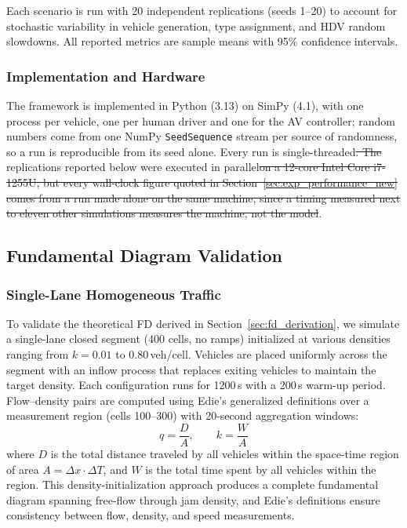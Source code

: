 \documentclass[review,number]{elsarticle} %
\providecommand{\DIFaddtex}[1]{{\protect\color{blue}\uwave{#1}}} %
\providecommand{\DIFdeltex}[1]{{\protect\color{red}\sout{#1}}}                      %
\providecommand{\DIFaddbegin}{} %
\providecommand{\DIFaddend}{} %
\providecommand{\DIFdelbegin}{} %
\providecommand{\DIFdelend}{} %
\providecommand{\DIFadd}[1]{\texorpdfstring{\DIFaddtex{#1}}{#1}} %
\providecommand{\DIFdel}[1]{\texorpdfstring{\DIFdeltex{#1}}{}} %
\newcommand{\DIFscaledelfig}{0.5}
\newlength{\DIFdelgraphicswidth} %
\newlength{\DIFdelgraphicsheight} %
\newcommand{\DIFaddincludegraphics}[2][]{{\color{blue}\fbox{\DIFOincludegraphics[#1]{#2}}}} %
\newcommand{\DIFdelincludegraphics}[2][]{%
\sbox{\DIFdelgraphicsbox}{\DIFOincludegraphics[#1]{#2}}%
\settoboxwidth{\DIFdelgraphicswidth}{\DIFdelgraphicsbox} %
\settoboxtotalheight{\DIFdelgraphicsheight}{\DIFdelgraphicsbox} %
\scalebox{\DIFscaledelfig}{%
\parbox[b]{\DIFdelgraphicswidth}{\usebox{\DIFdelgraphicsbox}\\[-\baselineskip] \rule{\DIFdelgraphicswidth}{0em}}\llap{\resizebox{\DIFdelgraphicswidth}{\DIFdelgraphicsheight}{%
\setlength{\unitlength}{\DIFdelgraphicswidth}%
\begin{picture}(1,1)%
\thicklines\linethickness{2pt} %
{\color[rgb]{1,0,0}\put(0,0){\framebox(1,1){}}}%
{\color[rgb]{1,0,0}\put(0,0){\line( 1,1){1}}}%
{\color[rgb]{1,0,0}\put(0,1){\line(1,-1){1}}}%
\end{picture}%
}\hspace*{3pt}}} %
} %
\DeclareRobustCommand{\DIFaddbegin}{\DIFOaddbegin \let\includegraphics\DIFaddincludegraphics} %
\DeclareRobustCommand{\DIFaddend}{\DIFOaddend \let\includegraphics\DIFOincludegraphics} %
\DeclareRobustCommand{\DIFdelbegin}{\DIFOdelbegin \let\includegraphics\DIFdelincludegraphics} %
\DeclareRobustCommand{\DIFdelend}{\DIFOaddend \let\includegraphics\DIFOincludegraphics} %
\begin{document}
Each scenario is run with 20 independent replications (seeds 1--20) to account for stochastic variability in vehicle generation, type assignment, and HDV random slowdowns. All reported metrics are sample means with 95\% confidence intervals.

\subsubsection{Implementation and Hardware}

The framework is implemented in Python (3.13) on SimPy (4.1), with one process per vehicle, one per human driver and one for the AV controller; random numbers come from one NumPy \texttt{SeedSequence} stream per source of randomness, so a run is reproducible from its seed alone. Every run is single-threaded\DIFdelbegin \DIFdel{. The }\DIFdelend \DIFaddbegin \DIFadd{; the }\DIFaddend replications reported below were executed in parallel\DIFdelbegin \DIFdel{on a 12-core Intel Core i7-1255U, but every wall-clock figure quoted in Section~\ref{sec:exp_performance_new} comes from a run made alone on the same machine, since a timing measured next to eleven other simulations measures the machine, not the model}\DIFdelend .


\subsection{Fundamental Diagram Validation}
\label{sec:exp_fd}

\subsubsection{Single-Lane Homogeneous Traffic}

To validate the theoretical FD derived in Section~\ref{sec:fd_derivation}, we simulate a single-lane closed segment (400 cells, no ramps) initialized at various densities ranging from $k = 0.01$ to $0.80$\,veh/cell. Vehicles are placed uniformly across the segment with an inflow process that replaces exiting vehicles to maintain the target density. Each configuration runs for 1200\,s with a 200\,s warm-up period. Flow--density pairs are computed using Edie's generalized definitions \citep{edie1963discussion} over a measurement region (cells 100--300) with 20-second aggregation windows:
\begin{equation}
    q = \frac{D}{A}, \qquad k = \frac{W}{A}
    \label{eq:fd_measurement}
\end{equation}
where $D$ is the total distance traveled by all vehicles within the space-time region of area $A = \Delta x \cdot \Delta T$, and $W$ is the total time spent by all vehicles within the region. This density-initialization approach produces a complete fundamental diagram spanning free-flow through jam density, and Edie's definitions ensure consistency between flow, density, and speed measurements.
\end{document}
